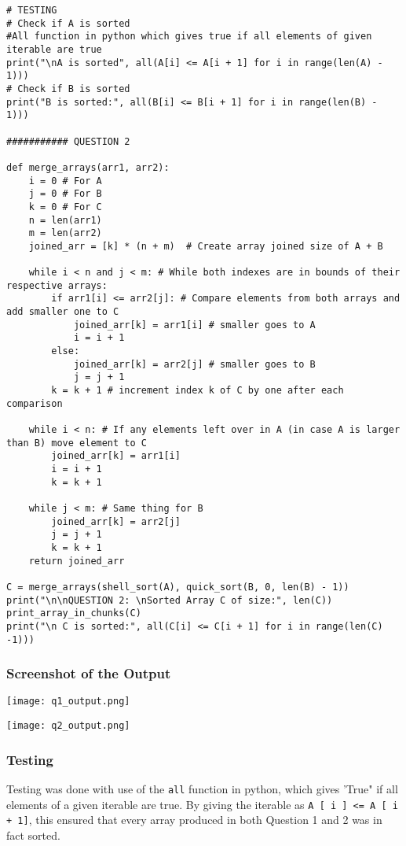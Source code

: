 \documentclass{article}
\begin{document}
\begin{lstlisting}
# TESTING
# Check if A is sorted
#All function in python which gives true if all elements of given iterable are true
print("\nA is sorted", all(A[i] <= A[i + 1] for i in range(len(A) - 1)))
# Check if B is sorted
print("B is sorted:", all(B[i] <= B[i + 1] for i in range(len(B) - 1)))

########### QUESTION 2

def merge_arrays(arr1, arr2):
    i = 0 # For A
    j = 0 # For B
    k = 0 # For C
    n = len(arr1)
    m = len(arr2)
    joined_arr = [k] * (n + m)  # Create array joined size of A + B

    while i < n and j < m: # While both indexes are in bounds of their respective arrays:
        if arr1[i] <= arr2[j]: # Compare elements from both arrays and add smaller one to C
            joined_arr[k] = arr1[i] # smaller goes to A
            i = i + 1
        else:
            joined_arr[k] = arr2[j] # smaller goes to B
            j = j + 1
        k = k + 1 # increment index k of C by one after each comparison

    while i < n: # If any elements left over in A (in case A is larger than B) move element to C
        joined_arr[k] = arr1[i]
        i = i + 1
        k = k + 1

    while j < m: # Same thing for B
        joined_arr[k] = arr2[j]
        j = j + 1
        k = k + 1
    return joined_arr

C = merge_arrays(shell_sort(A), quick_sort(B, 0, len(B) - 1))
print("\n\nQUESTION 2: \nSorted Array C of size:", len(C))
print_array_in_chunks(C)
print("\n C is sorted:", all(C[i] <= C[i + 1] for i in range(len(C) -1)))
\end{lstlisting}

\subsubsection*{Screenshot of the Output}
\texttt{[image: q1\_output.png]}

\texttt{[image: q2\_output.png]}

\subsubsection*{Testing}
Testing was done with use of the \texttt{all} function in python, which gives 'True" if all elements of a given iterable are true. By giving the iterable as  \texttt{A [ i ] <= A [ i + 1]}, this ensured that every array produced in both Question 1 and 2 was in fact sorted.
\end{document}
